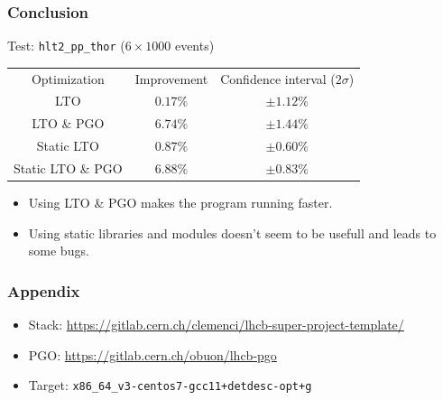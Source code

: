 \documentclass{beamer}
\begin{document}
    \begin{frame}[fragile]
        \frametitle{Conclusion}

        Test: \verb'hlt2_pp_thor' ($6 \times 1000$ events)
        \begin{center}
            \begin{tabular}{ c c c }
                Optimization & Improvement & Confidence interval ($2\sigma$) \\
                LTO & $0.17\%$ & $\pm 1.12\%$ \\
                LTO \& PGO & $6.74\%$ & $\pm 1.44\%$ \\
                Static LTO & $0.87\%$ & $\pm 0.60\%$ \\
                Static LTO \& PGO & $6.88\%$ & $\pm 0.83\%$
            \end{tabular}
        \end{center}

        \begin{itemize}
            \item Using LTO \& PGO makes the program running faster.
            \item Using static libraries and modules doesn't seem to be usefull and leads to some bugs.
        \end{itemize}
    \end{frame}

    \appendix

    \begin{frame}[fragile]
        \frametitle{Appendix}

        \begin{itemize}
            \item Stack: \scriptsize \url{https://gitlab.cern.ch/clemenci/lhcb-super-project-template/} \normalsize
            \item PGO: \scriptsize \url{https://gitlab.cern.ch/obuon/lhcb-pgo} \normalsize
            \item Target: \verb'x86_64_v3-centos7-gcc11+detdesc-opt+g'
        \end{itemize}
    \end{frame}
\end{document}
